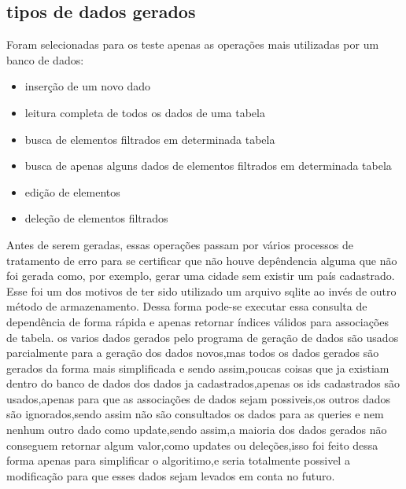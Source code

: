 \documentclass[
	12pt,				%
	openright,			%
	oneside,			%
	a4paper,			%
	english,			%
	french,				%
	spanish,			%
	brazil,				%
	]{abntex2}
\begin{document}
\subsection{tipos de dados gerados}
\label{subsec:tipos de dados gerados}
Foram selecionadas para os teste apenas as operações mais utilizadas por um banco de dados:
\begin{itemize}
\item inserção de um novo dado
\item leitura completa de todos os dados de uma tabela
\item busca de elementos filtrados em determinada tabela
\item busca de apenas alguns dados de elementos filtrados em determinada tabela
\item edição de elementos
\item deleção de elementos filtrados
\end{itemize}
Antes de serem geradas, essas operações passam por vários processos de tratamento de erro para se certificar que não houve depêndencia alguma que não foi gerada como, por exemplo, gerar uma cidade sem existir um país cadastrado. Esse foi um dos motivos de ter sido utilizado um arquivo sqlite ao invés de outro método de armazenamento. Dessa forma pode-se executar essa consulta de dependência de forma rápida e apenas retornar índices válidos para associações de tabela.
os varios dados gerados pelo programa de geração de dados são usados parcialmente para a geração dos dados novos,mas todos os dados gerados são gerados da forma mais simplificada e sendo assim,poucas coisas que ja existiam dentro do banco de dados dos dados ja cadastrados,apenas os ids cadastrados são usados,apenas para que as associações de dados sejam possiveis,os outros dados são ignorados,sendo assim não são consultados os dados para as queries e nem nenhum outro dado como update,sendo assim,a maioria dos dados gerados não conseguem retornar algum valor,como updates ou deleções,isso foi feito dessa forma apenas para simplificar o algoritimo,e seria totalmente possivel a modificação para que esses dados sejam levados em conta no futuro.
\end{document}
